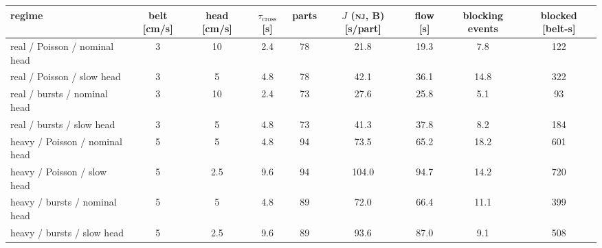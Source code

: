 \begin{tabular}{@{}lcccccccc@{}}
\toprule
regime & belt [cm/s] & head [cm/s] & $\tau_{\mathrm{cross}}$ [s] & parts & $J$ (\textsc{nj}, B) [s/part] & flow [s] & blocking events & blocked [belt-s] \\
\midrule
real / Poisson / nominal head & 3 & 10 & 2.4 & 78 & 21.8 & 19.3 & 7.8 & 122 \\
real / Poisson / slow head & 3 & 5 & 4.8 & 78 & 42.1 & 36.1 & 14.8 & 322 \\
real / bursts / nominal head & 3 & 10 & 2.4 & 73 & 27.6 & 25.8 & 5.1 & 93 \\
real / bursts / slow head & 3 & 5 & 4.8 & 73 & 41.3 & 37.8 & 8.2 & 184 \\
heavy / Poisson / nominal head & 5 & 5 & 4.8 & 94 & 73.5 & 65.2 & 18.2 & 601 \\
heavy / Poisson / slow head & 5 & 2.5 & 9.6 & 94 & 104.0 & 94.7 & 14.2 & 720 \\
heavy / bursts / nominal head & 5 & 5 & 4.8 & 89 & 72.0 & 66.4 & 11.1 & 399 \\
heavy / bursts / slow head & 5 & 2.5 & 9.6 & 89 & 93.6 & 87.0 & 9.1 & 508 \\
\bottomrule
\end{tabular}
